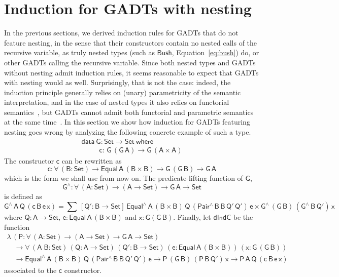 \documentclass[9pt]{entcs}
\begin{document}
\section{{\color{red}Induction for GADTs with nesting}}\label{sec:GADT-nested}


In the previous sections,
we derived induction rules for GADTs that do not feature nesting,
in the sense that their constructors contain no nested calls of the recursive variable,
as truly nested types (such as $\mathsf{Bush}$, Equation~\ref{eq:bush}) do,
or other GADTs calling the recursive variable.
Since both nested types
and GADTs without nesting admit induction rules,
it seems reasonable to expect that GADTs with nesting would as well.
Surprisingly, that is not the case:
indeed, the induction principle generally relies on (unary) parametricity of the semantic interpretation,
and in the case of nested types it also relies on functorial semantics~\cite{jp20},
but GADTs cannot admit both functorial and parametric semantics at the same time~\cite{jgj21}.
In this section we show how induction for GADTs featuring nesting goes wrong
by analyzing the following concrete example of such a type.
\begin{equation}\label{gadt-nested}
\begin{array}{l}
\mathsf{data\ G : Set \to Set\ where}\\
\mathsf{\;\;\;\;\;\;\;\;\;c :\, G\,(G\,A) \to G\,(A \times A)}
\end{array}
\end{equation}
The constructor $\mathsf{c}$ can be rewritten as
\[
\mathsf{c : \forall\, (B : Set) \to Equal\,A\,(B \times B) \to G\,(G\,B) \to G\,A}
\]
which is the form we shall use from now on.
The predicate-lifting function of $\mathsf{G}$,
\[
\mathsf{G^{\wedge} : \forall\, (A : Set) \to (A \to Set) \to G\,A \to Set}
\]
is defined as
\[
\mathsf{G^{\wedge}\,A\,Q\,(c\,B\,e\,x)
= \sum\, [Q' : B \to Set]\,
Equal^{\wedge}\,A\,(B \times B)\,Q\,(Pair^{\wedge}\,B\,B\,Q'\,Q')\,e
\times G^{\wedge}\,(G\,B)\,(G^{\wedge}\,B\,Q')\,x}
\]
where $\mathsf{Q : A \to Set}$, $\mathsf{e : Equal\,A\,(B \times B)}$ and $\mathsf{x : G(G\,B)}$.
Finally, let $\mathsf{dIndC}$ be the function
\[
\begin{array}{l}
\mathsf{\lambda\, (P : \forall\, (A : Set) \to (A \to Set) \to G\,A \to Set)} \\
\quad\mathsf{\to \forall\, (A\;B : Set)\, (Q : A \to Set)\, (Q' : B \to Set)\, (e : Equal\,A\,(B \times B))\, (x : G\,(G\,B))} \\
\quad\mathsf{\to Equal^{\wedge}\,A\,(B \times B)\,Q\,(Pair^{\wedge}\,B\,B\,Q'\,Q')\,e
	\to P\,(G\,B)\,(P\,B\,Q')\,x
	\to P\,A\,Q\,(c\,B\,e\,x)}
\end{array}
\]
associated to the $\mathsf{c}$ constructor.
\end{document}
